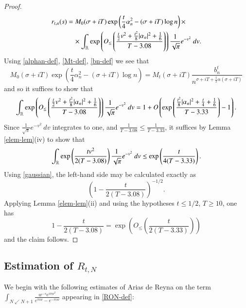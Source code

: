 \begin{proof}
\begin{align*}
 r_{t,n}(s) &= M_0(\sigma+iT) \exp\left( \frac{t}{4} \alpha_n^2 - (\sigma+iT) \log n\right) \times \\
&\quad \times  \int_{\mathbb{R}} \exp\left(  O_{\leq}\left( \frac{\frac{t}{2}v^2 + \frac{t^2}{8} |\alpha_n|^2 + \frac{1}{6}}{T-3.08} \right) \right) \frac{1}{\sqrt{\pi}} e^{-v^2}\ dv.
\end{align*}
Using \eqref{alphan-def}, \eqref{Mt-def}, \eqref{bn-def} we see that
$$ M_0(\sigma+iT) \exp\left( \frac{t}{4} \alpha_n^2 - (\sigma+iT) \log n\right) = M_t(\sigma+iT) \frac{b_n^t}{n^{\sigma+iT+\frac{t}{2} \alpha(\sigma+iT)}} $$
and so it suffices to show that
$$  \int_{\mathbb{R}} \exp\left( O_{\leq}\left( \frac{\frac{t}{2}v^2 + \frac{t^2}{8} |\alpha_n|^2 + \frac{1}{6}}{T-3.08} \right) \right)\frac{1}{\sqrt{\pi}} e^{-v^2}\ dv = 1 + O\left(\exp\left( \frac{\frac{t^2}{8} |\alpha_n|^2 + \frac{t}{4} + \frac{1}{6}}{T-3.33} \right)-1\right).$$
Since $\frac{1}{\sqrt{\pi}} e^{-v^2}\ dv $ integrates to one, and $\frac{1}{T-3.08} \leq \frac{1}{T-3.33}$, it suffices by Lemma \ref{elem-lem}(iv) to show that
\begin{equation}\label{ax}
  \int_{\mathbb{R}} \exp\left( \frac{t v^2}{2(T-3.08)} \right) \frac{1}{\sqrt{\pi}} e^{-v^2}\ dv \leq \exp\left( \frac{t}{4(T-3.33)} \right).
	\end{equation}
Using \eqref{gaussian}, the left-hand side may be calculated exactly as
$$ \left(1 - \frac{t}{2(T-3.08)}\right)^{-1/2}.$$
Applying Lemma \ref{elem-lem}(ii) and using the hypotheses $t \leq 1/2$, $T \geq 10$, one has
$$ 1 - \frac{t}{2(T-3.08)} = \exp\left( O_{\leq}\left( \frac{t}{2(T-3.33)} \right)\right)$$
and the claim follows.
\end{proof}

\subsection{Estimation of $R_{t,N}$}

We begin with the following estimates of Arias de Reyna \cite{arias} on the term $\int_{N \swarrow N+1} \frac{w^{-s} e^{i\pi w^2}}{e^{\pi i w} - e^{-\pi i w}}$ appearing in \eqref{RON-def}:

